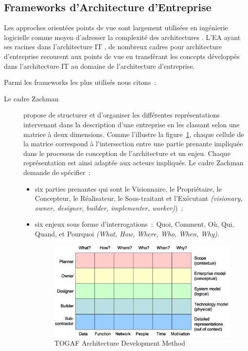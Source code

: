	\subsection{Frameworks d'Architecture d'Entreprise}

Les approches orientées points de vue sont largement utilisées en ingénierie logicielle comme moyen d'adresser la complexité des architectures \cite{steen2004supporting}. L'EA ayant ses racines dans l'architecture IT \cite{winter2008enterprise}, de nombreux cadres pour architecture d'entreprise recourent aux points de vue en transférant les concepts développés dans l'architecture IT au domaine de l'architecture d'entreprise. 

Parmi les frameworks les plus utilisés nous citons~:

\begin{description}
\item[Le cadre Zachman] \cite{zachman1987framework} propose de structurer et d'organiser les différentes représentations intervenant dans la description d'une entreprise en les classant selon une matrice à deux dimensions. Comme l'illustre la figure~\ref{fig:Zachman}, chaque cellule de la matrice correspond à l'intersection entre une partie prenante impliquée dans le processus de conception de l'architecture et un enjeu. Chaque représentation est ainsi adaptée aux acteurs impliqués. Le cadre Zachman demande de spécifier~:

	\begin{itemize}

\item six parties prenantes qui sont le Visionnaire, le Propriétaire, le Concepteur, le Réalisateur, le Sous-traitant et l'Exécutant \textit{(visionary, owner, designer, builder, implementer, worker)})~;

\item six enjeux sous forme d'interrogations~:~Quoi, Comment, Où, Qui, Quand, et Pourquoi \textit{(What, How, Where, Who, When, Why)}.

\begin{figure}[!htbp]
 \begin{center}
  \includegraphics[width=1\textwidth]{images/Chapitre1/zachman.png}
 \end{center}
 \caption{TOGAF Architecture Development Method  \protect\cite{zachman1987framework}}
 \label{fig:Zachman}
\end{figure}


\end{itemize}
\end{description}
